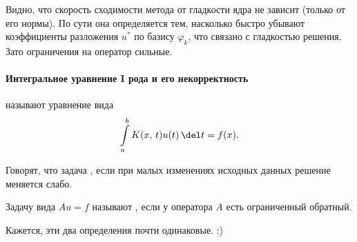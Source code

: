 \documentclass{trlnotes}
\begin{document}
    \begin{rem}
        Видно, что скорость сходимости метода от гладкости ядра не зависит (только от его нормы). По сути она определяется тем, насколько быстро убывают коэффициенты разложения $u^*$ по базису $\varphi_k$, что связано с гладкостью решения. Зато ограничения на оператор сильные.
    \end{rem}

    \paragraph{Интегральное уравнение I рода и его некорректность}

    \begin{de}
         называют уравнение вида
        \[
            \int\limits_a^b K(x, \, t) u(t) \, \del t = f(x).
        \]
    \end{de}

    \begin{de}
        Говорят, что задача , если при малых изменениях исходных данных решение меняется слабо.
    \end{de}

    \begin{de}
        Задачу вида $Au = f$ называют , если у оператора $A$ есть ограниченный обратный.
    \end{de}

    Кажется, эти два определения почти одинаковые. :)
\end{document}
